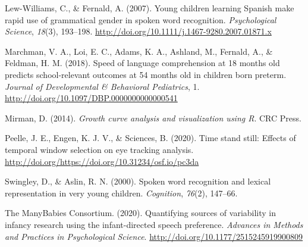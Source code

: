 \documentclass[10pt, letterpaper]{article}
\begin{document}
\leavevmode\hypertarget{ref-Lew-Williams2007}{}%
Lew-Williams, C., \& Fernald, A. (2007). Young children learning Spanish
make rapid use of grammatical gender in spoken word recognition.
\emph{Psychological Science}, \emph{18}(3), 193--198.
\url{http://doi.org/10.1111/j.1467-9280.2007.01871.x}

\leavevmode\hypertarget{ref-Marchman2018}{}%
Marchman, V. A., Loi, E. C., Adams, K. A., Ashland, M., Fernald, A., \&
Feldman, H. M. (2018). Speed of language comprehension at 18 months old
predicts school-relevant outcomes at 54 months old in children born
preterm. \emph{Journal of Developmental \& Behavioral Pediatrics}, 1.
\url{http://doi.org/10.1097/DBP.0000000000000541}

\leavevmode\hypertarget{ref-Mirman2014}{}%
Mirman, D. (2014). \emph{Growth curve analysis and visualization using
R}. CRC Press.

\leavevmode\hypertarget{ref-Peelle2020}{}%
Peelle, J. E., Engen, K. J. V., \& Sciences, B. (2020). Time stand
still: Effects of temporal window selection on eye tracking analysis.
\url{http://doi.org/https://doi.org/10.31234/osf.io/pc3da}

\leavevmode\hypertarget{ref-Swingley2000}{}%
Swingley, D., \& Aslin, R. N. (2000). Spoken word recognition and
lexical representation in very young children. \emph{Cognition},
\emph{76}(2), 147--66.

\leavevmode\hypertarget{ref-TheManyBabiesConsortium2020}{}%
The ManyBabies Consortium. (2020). Quantifying sources of variability in
infancy research using the infant-directed speech preference.
\emph{Advances in Methods and Practices in Psychological Science}.
\url{http://doi.org/10.1177/2515245919900809}


\end{document}
